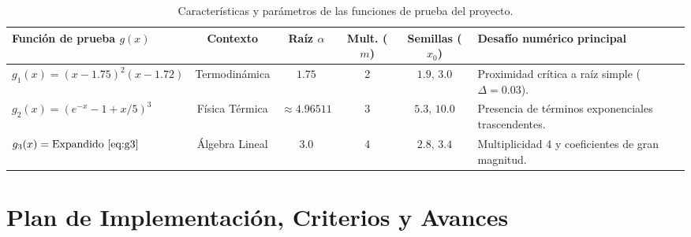 \documentclass[10pt, a4paper]{article}
\begin{document}
\begin{table}[htbp]
    \centering
    \small
    \caption{Características y parámetros de las funciones de prueba del proyecto.}
    \label{tab:problemas}
    \begin{tabularx}{\textwidth}{p{4.2cm} c c c c X}
        \toprule
        \textbf{Función de prueba $g(x)$} & \textbf{Contexto} & \textbf{Raíz $\alpha$} & \textbf{Mult. ($m$)} & \textbf{Semillas ($x_0$)} & \textbf{Desafío numérico principal} \\
        \midrule
        $g_1(x) = (x-1.75)^2(x-1.72)$ & Termodinámica & $1.75$ & 2 & $1.9, \, 3.0$ & Proximidad crítica a raíz simple ($\Delta=0.03$). \\
        $g_2(x) = (e^{-x} - 1 + x/5)^3$ & Física Térmica & $\approx 4.96511$ & 3 & $5.3, \, 10.0$ & Presencia de términos exponenciales trascendentes. \\
        $g_3(x) = \text{Expandido \eqref{eq:g3}}$ & Álgebra Lineal & $3.0$ & 4 & $2.8, \, 3.4$ & Multiplicidad 4 y coeficientes de gran magnitud. \\
        \bottomrule
    \end{tabularx}
\end{table}

\section{Plan de Implementación, Criterios y Avances}
\end{document}
